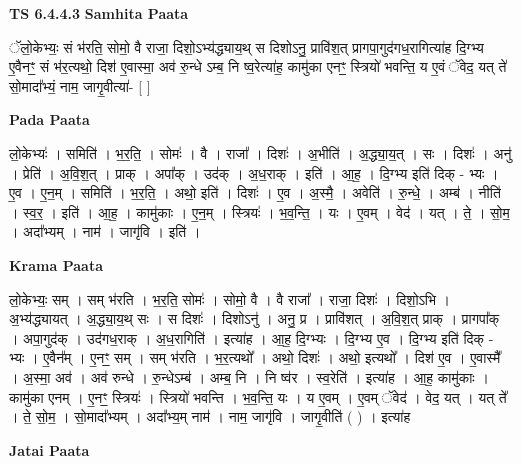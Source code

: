 \documentclass[17pt]{extarticle}
\begin{document}
\textbf{TS 6.4.4.3 } \newline
\textbf{Samhita Paata} \newline

ॅलो॒केभ्यः॒ सं भ॑रति॒ सोमो॒ वै राजा॒ दिशो॒ऽभ्य॑द्ध्याय॒थ् स दिशोऽनु॒ प्रावि॑श॒त् प्रागपा॒गुद॑गध॒रागित्या॑ह दि॒ग्भ्य ए॒वैनꣳ॒॒ सं भ॑र॒त्यथो॒ दिश॑ ए॒वास्मा॒ अव॑ रु॒न्धे ऽम्ब॒ नि ष्व॒रेत्या॑ह॒ कामु॑का एनꣳ॒॒ स्त्रियो॑ भवन्ति॒ य ए॒वं ॅवेद॒ यत् ते॑ सो॒मादा᳚भ्यं॒ नाम॒ जागृ॒वीत्या॑- [  ] \newline

\textbf{Pada Paata} \newline

लो॒केभ्यः॑ । समिति॑ । भ॒र॒ति॒ । सोमः॑ । वै । राजा᳚ । दिशः॑ । अ॒भीति॑ । अ॒द्ध्या॒य॒त् । सः । दिशः॑ । अनु॑ । प्रेति॑ । अ॒वि॒श॒त् । प्राक् । अपा᳚क् । उद॑क् । अ॒ध॒राक् । इति॑ । आ॒ह॒ । दि॒ग्भ्य इति॑ दिक् - भ्यः । ए॒व । ए॒न॒म् । समिति॑ । भ॒र॒ति॒ । अथो॒ इति॑ । दिशः॑ । ए॒व । अ॒स्मै॒ । अवेति॑ । रु॒न्धे॒ । अम्ब॑ । नीति॑ । स्व॒र॒ । इति॑ । आ॒ह॒ । कामु॑काः । ए॒न॒म् । स्त्रियः॑ । भ॒व॒न्ति॒ । यः । ए॒वम् । वेद॑ । यत् । ते॒ । सो॒म॒ । अदा᳚भ्यम् । नाम॑ । जागृ॑वि । इति॑ ।  \newline


\textbf{Krama Paata} \newline

लो॒केभ्यः॒ सम् । सम् भ॑रति । भ॒र॒ति॒ सोमः॑ । सोमो॒ वै । वै राजा᳚ । राजा॒ दिशः॑ । दिशो॒ऽभि । अ॒भ्य॑द्ध्यायत् । अ॒द्ध्या॒य॒थ् सः । स दिशः॑ । दिशोऽनु॑ । अनु॒ प्र । प्रावि॑शत् । अ॒वि॒श॒त् प्राक् । प्रागपा᳚क् । अपा॒गुद॑क् । उद॑गध॒राक् । अ॒ध॒रागिति॑ । इत्या॑ह । आ॒ह॒ दि॒ग्भ्यः । दि॒ग्भ्य ए॒व । दि॒ग्भ्य इति॑ दिक् - भ्यः । ए॒वैन᳚म् । ए॒नꣳ॒॒ सम् । सम् भ॑रति । भ॒र॒त्यथो᳚ । अथो॒ दिशः॑ । अथो॒ इत्यथो᳚ । दिश॑ ए॒व । ए॒वास्मै᳚ । अ॒स्मा॒ अव॑ । अव॑ रुन्धे । रु॒न्धेऽम्ब॑ । अम्ब॒ नि । नि ष्व॑र । स्व॒रेति॑ । इत्या॑ह । आ॒ह॒ कामु॑काः । कामु॑का एनम् । ए॒नꣳ॒॒ स्त्रियः॑ । स्त्रियो॑ भवन्ति । भ॒व॒न्ति॒ यः । य ए॒वम् । ए॒वम् ॅवेद॑ । वेद॒ यत् । यत् ते᳚ । ते॒ सो॒म॒ । सो॒मादा᳚भ्यम् । अदा᳚भ्य॒म् नाम॑ । नाम॒ जागृ॑वि । जागृ॒वीति॑ ( ) । इत्या॑ह \newline

\textbf{Jatai Paata} \newline
\end{document}
